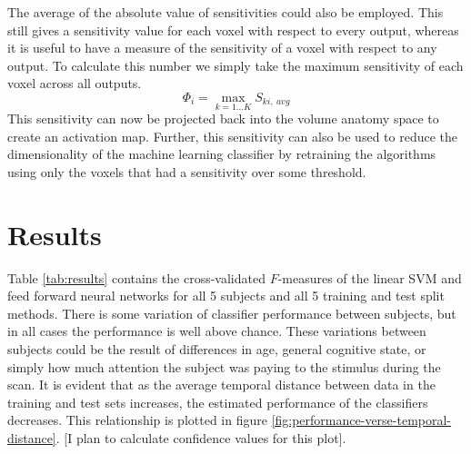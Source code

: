 \documentclass[final]{article}
\begin{document}
The average of the absolute value of sensitivities could also be employed.
This still gives a sensitivity value for each voxel with respect to every output, whereas it is useful to have a measure of the sensitivity of a voxel with respect to any output.
To calculate this number we simply take the maximum sensitivity of each voxel across all outputs.
\begin{equation}
\Phi_{i} = \max_{k=1 \dots K}{S_{ki,~avg}}
\end{equation}
This sensitivity can now be projected back into the volume anatomy space to create an activation map.
Further, this sensitivity can also be used to reduce the dimensionality of the machine learning classifier by retraining the algorithms using only the voxels that had a sensitivity over some threshold.

\section{Results}
Table \ref{tab:results} contains the cross-validated $F$-measures of the linear SVM and feed forward neural networks for all 5 subjects and all 5 training and test split methods.
There is some variation of classifier performance between subjects, but in all cases the performance is well above chance. 
These variations between subjects could be the result of differences in age, general cognitive state, or simply how much attention the subject was paying to the stimulus during the scan.
It is evident that as the average temporal distance between data in the training and test sets increases, the estimated performance of the classifiers decreases.
This relationship is plotted in figure \ref{fig:performance-verse-temporal-distance}.
[I plan to calculate confidence values for this plot].
\end{document}
